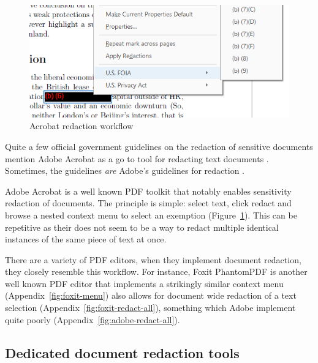 \documentclass[\version]{l4proj}
\begin{document}
\begin{figure}
    \includegraphics[width=\linewidth]{images/related_products/adobe_redaction.png}
    \caption{Acrobat redaction workflow}\label{fig:adobe-redaction}
    \vspace{-20pt}
\end{figure}

Quite a few official government guidelines on the redaction of sensitive documents mention Adobe Acrobat as a go to tool for redacting text documents \autocite{thenationalarchivesRedactionToolkitPaper2016}.
Sometimes, the guidelines \textit{are} Adobe's guidelines for redaction \autocite{scottishgovernmentRedactingInformation2019}.

Adobe Acrobat is a well known PDF toolkit that notably enables sensitivity redaction of documents.
The principle is simple: select text, click redact and browse a nested context menu to select an exemption (Figure~\ref{fig:adobe-redaction}).
This can be repetitive as their does not seem to be a way to redact multiple identical instances of the same piece of text at once.

There are a variety of PDF editors, when they implement document redaction, they closely resemble this workflow.
For instance, Foxit PhantomPDF is another well known PDF editor that implements a strikingly similar context menu (Appendix~\ref{fig:foxit-menu}) also allows for document wide redaction of a text selection (Appendix~\ref{fig:foxit-redact-all}), something which Adobe implement quite poorly (Appendix~\ref{fig:adobe-redact-all}).

\subsection{Dedicated document redaction tools}
\end{document}
